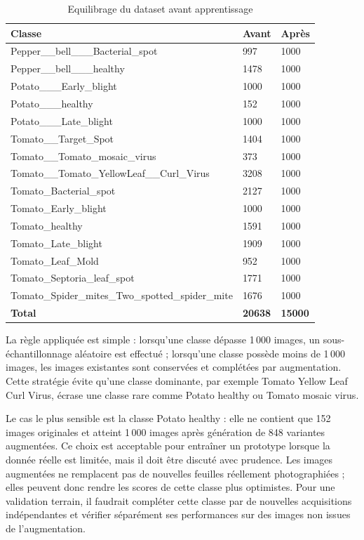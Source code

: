 ﻿\documentclass[11pt,a4paper,openany]{report}
\begin{document}
\begin{table}[H]
\centering
\small
\renewcommand{\arraystretch}{1.18}
\begin{tabular}{|p{7.2cm}|C{2.2cm}|C{2.2cm}|}
\hline
\textbf{Classe} & \textbf{Avant} & \textbf{Après} \\
\hline
Pepper\_\_bell\_\_\_Bacterial\_spot & 997 & 1000 \\
Pepper\_\_bell\_\_\_healthy & 1478 & 1000 \\
Potato\_\_\_Early\_blight & 1000 & 1000 \\
Potato\_\_\_healthy & 152 & 1000 \\
Potato\_\_\_Late\_blight & 1000 & 1000 \\
Tomato\_\_Target\_Spot & 1404 & 1000 \\
Tomato\_\_Tomato\_mosaic\_virus & 373 & 1000 \\
Tomato\_\_Tomato\_YellowLeaf\_\_Curl\_Virus & 3208 & 1000 \\
Tomato\_Bacterial\_spot & 2127 & 1000 \\
Tomato\_Early\_blight & 1000 & 1000 \\
Tomato\_healthy & 1591 & 1000 \\
Tomato\_Late\_blight & 1909 & 1000 \\
Tomato\_Leaf\_Mold & 952 & 1000 \\
Tomato\_Septoria\_leaf\_spot & 1771 & 1000 \\
Tomato\_Spider\_mites\_Two\_spotted\_spider\_mite & 1676 & 1000 \\
\hline
\textbf{Total} & \textbf{20638} & \textbf{15000} \\
\hline
\end{tabular}
\caption{Equilibrage du dataset avant apprentissage}
\label{tab:equilibrage_dataset}
\end{table}

La règle appliquée est simple : lorsqu'une classe dépasse 1\,000 images, un sous-échantillonnage aléatoire est effectué ; lorsqu'une classe possède moins de 1\,000 images, les images existantes sont conservées et complétées par augmentation. Cette stratégie évite qu'une classe dominante, par exemple Tomato Yellow Leaf Curl Virus, écrase une classe rare comme Potato healthy ou Tomato mosaic virus.

Le cas le plus sensible est la classe Potato healthy : elle ne contient que 152 images originales et atteint 1\,000 images après génération de 848 variantes augmentées. Ce choix est acceptable pour entraîner un prototype lorsque la donnée réelle est limitée, mais il doit être discuté avec prudence. Les images augmentées ne remplacent pas de nouvelles feuilles réellement photographiées ; elles peuvent donc rendre les scores de cette classe plus optimistes. Pour une validation terrain, il faudrait compléter cette classe par de nouvelles acquisitions indépendantes et vérifier séparément ses performances sur des images non issues de l'augmentation.
\end{document}
